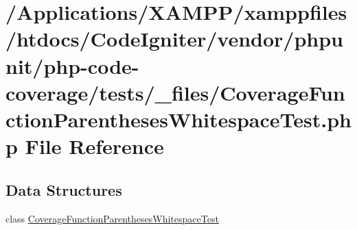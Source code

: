 \hypertarget{php-code-coverage_2tests_2__files_2_coverage_function_parentheses_whitespace_test_8php}{}\section{/\+Applications/\+X\+A\+M\+P\+P/xamppfiles/htdocs/\+Code\+Igniter/vendor/phpunit/php-\/code-\/coverage/tests/\+\_\+files/\+Coverage\+Function\+Parentheses\+Whitespace\+Test.php File Reference}
\label{php-code-coverage_2tests_2__files_2_coverage_function_parentheses_whitespace_test_8php}
\subsection*{Data Structures}
\begin{DoxyCompactItemize}
\item 
class \mbox{\hyperlink{class_coverage_function_parentheses_whitespace_test}{Coverage\+Function\+Parentheses\+Whitespace\+Test}}
\end{DoxyCompactItemize}
